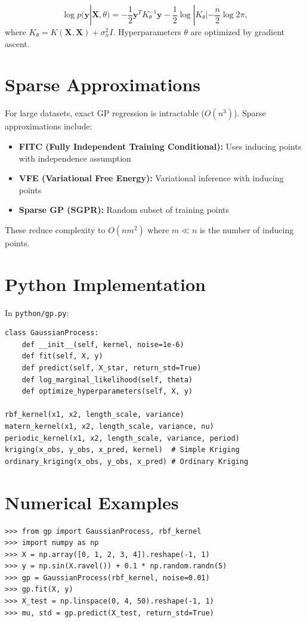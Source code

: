 \[
\log p(\mathbf{y} | \mathbf{X}, \theta) = -\frac{1}{2} \mathbf{y}^T K_\theta^{-1} \mathbf{y} - \frac{1}{2} \log |K_\theta| - \frac{n}{2} \log 2\pi,
\]
where $K_\theta = K(\mathbf{X}, \mathbf{X}) + \sigma_n^2 I$. Hyperparameters $\theta$ are optimized by gradient ascent.

\section{Sparse Approximations}

For large datasets, exact GP regression is intractable ($O(n^3)$). Sparse approximations include:
\begin{itemize}
    \item \textbf{FITC (Fully Independent Training Conditional):} Uses inducing points with independence assumption
    \item \textbf{VFE (Variational Free Energy):} Variational inference with inducing points
    \item \textbf{Sparse GP (SGPR):} Random subset of training points
\end{itemize}
These reduce complexity to $O(nm^2)$ where $m \ll n$ is the number of inducing points.

\section{Python Implementation}

In \texttt{python/gp.py}:

\begin{lstlisting}[style=python, caption={Key functions in python/gp.py}]
class GaussianProcess:
    def __init__(self, kernel, noise=1e-6)
    def fit(self, X, y)
    def predict(self, X_star, return_std=True)
    def log_marginal_likelihood(self, theta)
    def optimize_hyperparameters(self, X, y)

rbf_kernel(x1, x2, length_scale, variance)
matern_kernel(x1, x2, length_scale, variance, nu)
periodic_kernel(x1, x2, length_scale, variance, period)
kriging(x_obs, y_obs, x_pred, kernel)  # Simple Kriging
ordinary_kriging(x_obs, y_obs, x_pred) # Ordinary Kriging
\end{lstlisting}

\section{Numerical Examples}

\begin{example}[GP Regression]
\begin{lstlisting}[style=python]
>>> from gp import GaussianProcess, rbf_kernel
>>> import numpy as np
>>> X = np.array([0, 1, 2, 3, 4]).reshape(-1, 1)
>>> y = np.sin(X.ravel()) + 0.1 * np.random.randn(5)
>>> gp = GaussianProcess(rbf_kernel, noise=0.01)
>>> gp.fit(X, y)
>>> X_test = np.linspace(0, 4, 50).reshape(-1, 1)
>>> mu, std = gp.predict(X_test, return_std=True)
\end{lstlisting}
\end{example}

